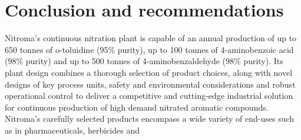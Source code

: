 \section*{Conclusion and recommendations}
Nitroma's continuous nitration plant is capable of an annual production of up to 650 tonnes of o-toluidine (95\% purity), up to 100 tonnes of 4-aminobenzoic acid (98\% purity) and up to 500 tonnes of 4-aminobenzaldehyde (98\% purity). Its plant design combines a thorough selection of product choices, along with novel designs of key process units, safety and environmental considerations and robust operational control to deliver a competitive and cutting-edge industrial solution for continuous production of high demand nitrated aromatic compounds. Nitroma's carefully selected products encompass a wide variety of end-uses such as in pharmaceuticals, herbicides and  

